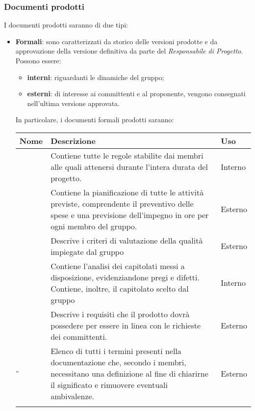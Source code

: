 \subsubsection{Documenti prodotti \hfil}

I documenti prodotti saranno di due tipi:
\begin{itemize}
	\item \textbf{Formali}: sono caratterizzati da storico delle versioni prodotte e da approvazione della versione definitiva da parte del \textit{Responsabile di Progetto}. Possono essere:
	\begin{itemize}
		\item \textbf{interni}: riguardanti le dinamiche del gruppo;
		\item \textbf{esterni}: di interesse ai committenti e al proponente, vengono consegnati nell'ultima versione approvata.
	\end{itemize} 
In particolare, i documenti formali prodotti saranno:
\newpage
{
	\setlength{\freewidth}{\dimexpr\textwidth-1\tabcolsep}
	\renewcommand{\arraystretch}{1.5}
	\setlength{\aboverulesep}{0pt}
	\setlength{\belowrulesep}{0pt}
	\begin{longtable}{L{.210\freewidth} L{.6\freewidth} L{.080\freewidth}}
		\toprule 
		\textbf{Nome} & \textbf{Descrizione} & \textbf{Uso}\\
		\toprule
		\endhead		
		\NdP{} & Contiene tutte le regole stabilite dai membri alle quali attenersi durante l'intera durata del progetto. & Interno \\ 
		\PdP{} & Contiene la pianificazione di tutte le attività previste, comprendente il preventivo delle spese e una previsione dell'impegno in ore per ogni membro del gruppo. & Esterno \\
		\PdQ{} & Descrive i criteri di valutazione della qualità impiegate dal gruppo & Esterno \\ 
		\SdF{} & Contiene l'analisi dei capitolati messi a disposizione, evidenziandone pregi e difetti. Contiene, inoltre, il capitolato scelto dal gruppo & Interno \\
		\AdR{} & Descrive i requisiti che il prodotto dovrà possedere per essere in linea con le richieste dei committenti. & Esterno \\ 	
		\G{} & Elenco di tutti i termini presenti nella documentazione che, secondo i membri, necessitano una definizione al fine di chiarirne il significato e rimuovere eventuali ambivalenze. & Esterno \\  			
		\bottomrule
		\hiderowcolors
	\end{longtable}
}


\end{itemize}
